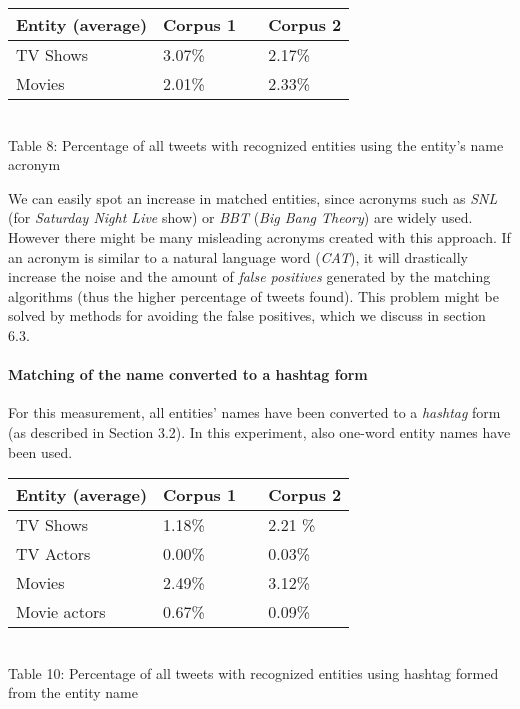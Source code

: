 \begin{center}
  \begin{tabular}{ | p{4cm} | p{2cm} | p{1cm}| p{2cm} | } \hline
    Entity (average) & Corpus 1 & & Corpus 2 \\ \hline
    TV Shows & 3.07\% & & 2.17\% \\ \hline
    Movies & 2.01\% & & 2.33\% \\ \hline
  \end{tabular} \\
  Table 8: Percentage of all tweets with recognized entities using the entity's name acronym \\
\end{center}

We can easily spot an increase in matched entities, since acronyms such as \textit{SNL}
(for \textit{Saturday Night Live} show) or \textit{BBT} (\textit{Big Bang Theory}) are widely used.
However there might be many misleading acronyms created with this approach. If an acronym is similar
to a natural language word (\eg \textit{CAT}), it will drastically increase the noise and the amount
of \textit{false positives} generated by the matching algorithms (thus the higher percentage of tweets
found). This problem might be solved by methods for avoiding the false positives, which we discuss in section 6.3.

\paragraph{Matching of the name converted to a hashtag form}
For this measurement, all entities' names have been converted to a \textit{hashtag} form (as described
in Section 3.2). In this experiment, also one-word entity names have been used.

\begin{center}
  \begin{tabular}{ | p{4cm} | p{2cm} | p{1cm}| p{2cm} | } \hline
    Entity (average) & Corpus 1 & & Corpus 2 \\ \hline
    TV Shows & 1.18\% & & 2.21 \% \\ \hline
    TV Actors & 0.00\% & & 0.03\% \\ \hline
    Movies & 2.49\% & & 3.12\% \\ \hline
    Movie actors & 0.67\% & & 0.09\% \\ \hline
  \end{tabular} \\
  Table 10: Percentage of all tweets with recognized entities using hashtag formed from the entity name \\
\end{center}

